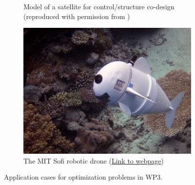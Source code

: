 \documentclass[12pt]{article}
\begin{document}
\begin{figure}[t]
\begin{subfigure}[t]{0.3\textwidth}
			\caption{Model of a satellite for control/structure co-design (reproduced with permission from \cite{finozzi2022sub})}
			\label{fig:codesign_sat}
		\end{subfigure}\hfill
		\begin{subfigure}[t]{0.35\textwidth}
			\includegraphics[width=\columnwidth]{Sofi_MIT.jpeg}%
			\caption{The MIT Sofi robotic drone (\href{https://www.csail.mit.edu/research/sofi-soft-robotic-fish}{Link to webpage})}
			\label{fig:sofi-mit}
		\end{subfigure}
		\caption[]{Application cases for optimization problems in WP3.}%
		\label{fig:optmisation}%
	\end{figure}




\end{document}
